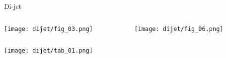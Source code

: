 \documentclass[8pt]{beamer}
\begin{document}
\begin{frame}{\large Di-jet}
\begin{columns}
 \begin{column}{6cm}
  \texttt{[image: dijet/fig\_03.png]}\\
 \end{column}
 \begin{column}{6cm}
  \texttt{[image: dijet/fig\_06.png]}\\
 \end{column}
\end{columns}
{\centering
\texttt{[image: dijet/tab\_01.png]}\\
}
\end{frame}
\end{document}
